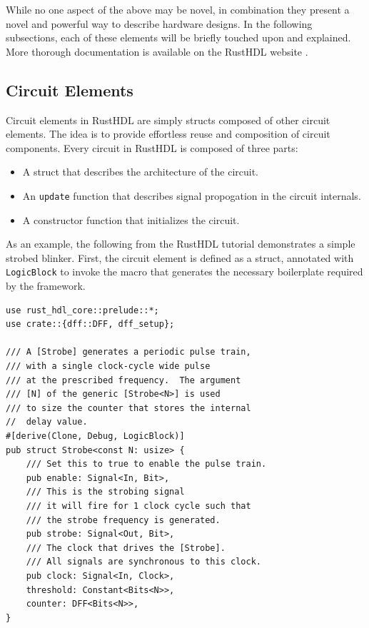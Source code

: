 \documentclass[conference]{IEEEtran}
\begin{document}
While no one aspect of the above may be novel, in combination they present a 
novel and powerful way to describe hardware designs.  In the following subsections, each of these 
elements will be briefly touched upon and explained.  More thorough documentation is available on the
RustHDL website \cite{b6}.

\subsection{Circuit Elements}

Circuit elements in RustHDL are simply structs composed of other circuit elements.  The idea is to
provide effortless reuse and composition of circuit components.  Every circuit in RustHDL is composed
of three parts:
\begin{itemize}
  \item A struct that describes the architecture of the circuit.
  \item An \verb|update| function that describes signal propogation in the circuit internals.
  \item A constructor function that initializes the circuit.
\end{itemize}

As an example, the following from the RustHDL tutorial demonstrates a simple strobed blinker.  First, the
circuit element is defined as a struct, annotated with \verb|LogicBlock| to invoke the macro that generates
the necessary boilerplate required by the framework.

\begin{verbatim}
use rust_hdl_core::prelude::*;
use crate::{dff::DFF, dff_setup};

/// A [Strobe] generates a periodic pulse train, 
/// with a single clock-cycle wide pulse
/// at the prescribed frequency.  The argument 
/// [N] of the generic [Strobe<N>] is used
/// to size the counter that stores the internal 
//  delay value.  
#[derive(Clone, Debug, LogicBlock)]
pub struct Strobe<const N: usize> {
    /// Set this to true to enable the pulse train.
    pub enable: Signal<In, Bit>,
    /// This is the strobing signal 
    /// it will fire for 1 clock cycle such that 
    /// the strobe frequency is generated.
    pub strobe: Signal<Out, Bit>,
    /// The clock that drives the [Strobe].  
    /// All signals are synchronous to this clock.
    pub clock: Signal<In, Clock>,
    threshold: Constant<Bits<N>>,
    counter: DFF<Bits<N>>,
}
\end{verbatim}
\end{document}
